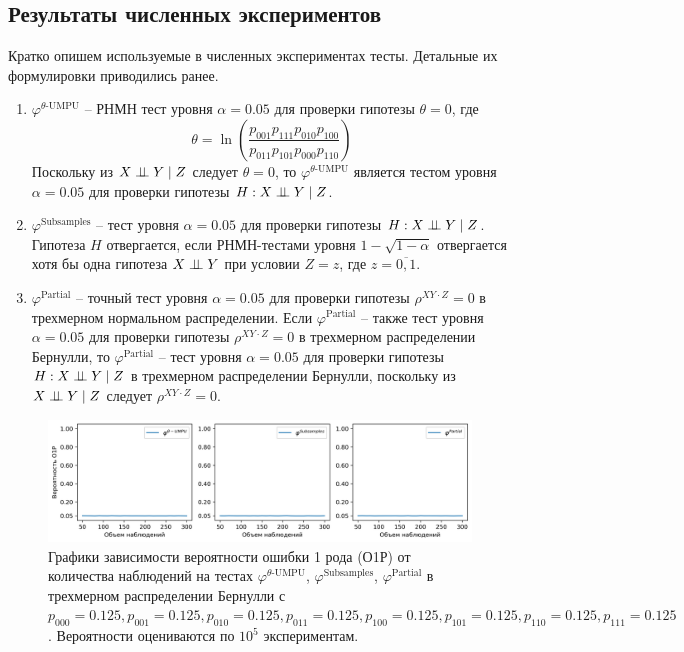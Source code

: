 \begin{centering}
    \subsection{Результаты численных экспериментов}
\end{centering}

Кратко опишем используемые в численных экспериментах тесты.
Детальные их формулировки приводились ранее.
\begin{enumerate}
    \item $\varphi^{\text{$\theta$-UMPU}}$ -- РНМН тест уровня 
    $\alpha=0.05$ для проверки гипотезы $\theta=0$, где 
     $$\theta = \ln  \left(\dfrac{p_{001}p_{111}p_{010}p_{100}}{p_{011}p_{101}p_{000}p_{110}}\right)$$
    Поскольку из $X \perp\!\!\!\perp Y \mid Z$ следует $\theta=0$, 
    то $\varphi^{\text{$\theta$-UMPU}}$ является тестом уровня $\alpha=0.05$ для проверки
    гипотезы $H:X \perp\!\!\!\perp Y \mid Z$.
    \item $\varphi^{\text{Subsamples}}$ -- тест уровня $\alpha=0.05$
    для проверки гипотезы $H: X \perp\!\!\!\perp Y \mid Z$.
    Гипотеза $H$ отвергается, если РНМН-тестами уровня $1-\sqrt{1-\alpha}$
     отвергается хотя бы 
    одна гипотеза $X \perp\!\!\!\perp Y$ при условии $Z=z$, 
    где $z=\overline{0,1}$.
    \item $\varphi^{\text{Partial}}$ -- точный тест уровня $\alpha=0.05$
    для проверки гипотезы $\rho^{XY\cdot Z}=0$ в трехмерном нормальном распределении.
    Если $\varphi^{\text{Partial}}$ -- также тест
    уровня $\alpha=0.05$ для проверки гипотезы $\rho^{XY\cdot Z}=0$ в трехмерном распределении Бернулли, 
    то $\varphi^{\text{Partial}}$ -- тест уровня $\alpha=0.05$ для проверки
    гипотезы $H:X \perp\!\!\!\perp Y \mid Z$ в трехмерном распределении Бернулли,
    поскольку из $X \perp\!\!\!\perp Y \mid Z$ следует $\rho^{XY\cdot Z}=0$.
\end{enumerate}

\begin{figure}[H]
    \centering
    \includegraphics[scale=0.65]{images/graph1.png}
    \caption{Графики зависимости вероятности ошибки 1 рода (О1Р) от количества наблюдений
    на тестах $\varphi^{\text{$\theta$-UMPU}}$, $\varphi^{\text{Subsamples}}$, $\varphi^{\text{Partial}}$
    в трехмерном распределении Бернулли с $p_{000}=0.125, p_{001}=0.125, p_{010}=0.125, p_{011}=0.125,
    p_{100}=0.125, p_{101}=0.125, p_{110}=0.125, p_{111}=0.125$. Вероятности оцениваются по $10^5$ экспериментам.} \label{fig:1}
\end{figure}
    

